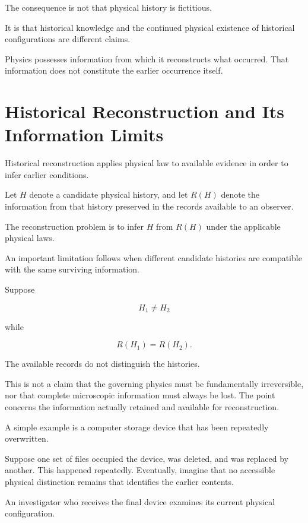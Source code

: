\documentclass[12pt,onecolumn]{article}
\begin{document}
The consequence is not that physical history is fictitious.

It is that historical knowledge and the continued physical existence of historical configurations are different claims.

Physics possesses information from which it reconstructs what occurred. That information does not constitute the earlier occurrence itself.

\section{Historical Reconstruction and Its Information Limits}

Historical reconstruction applies physical law to available evidence in order to infer earlier conditions.

Let \(H\) denote a candidate physical history, and let \(R(H)\) denote the information from that history preserved in the records available to an observer.

The reconstruction problem is to infer \(H\) from \(R(H)\) under the applicable physical laws.

An important limitation follows when different candidate histories are compatible with the same surviving information.

Suppose

\begin{equation}
H_1\neq H_2
\end{equation}

while

\begin{equation}
R(H_1)=R(H_2).
\end{equation}

The available records do not distinguish the histories.

This is not a claim that the governing physics must be fundamentally irreversible, nor that complete microscopic information must always be lost. The point concerns the information actually retained and available for reconstruction.

A simple example is a computer storage device that has been repeatedly overwritten.

Suppose one set of files occupied the device, was deleted, and was replaced by another. This happened repeatedly. Eventually, imagine that no accessible physical distinction remains that identifies the earlier contents.

An investigator who receives the final device examines its current physical configuration.
\end{document}
